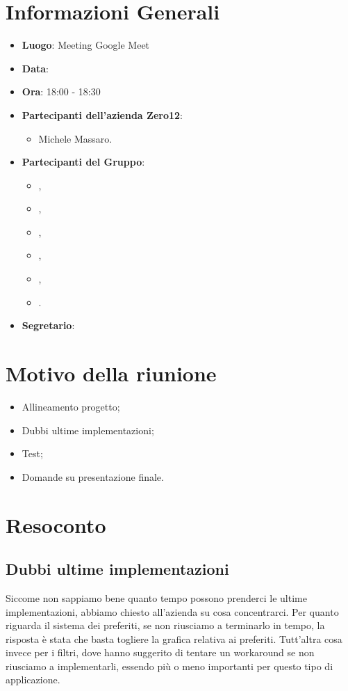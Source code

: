 \section{Informazioni Generali}

\begin{itemize}
\item{\textbf{Luogo}}: Meeting Google Meet
\item{\textbf{Data}}: \D
\item{\textbf{Ora}}: 18:00 - 18:30
\item{\textbf{Partecipanti dell'azienda Zero12}}: 
	\begin{itemize}
	\item{Michele Massaro.} 
	\end{itemize} 
\item{\textbf{Partecipanti del Gruppo}}: 
	\begin{itemize}
	\item{\EP{},} 
	\item{\FP{},}
	\item{\GC{},}
	\item{\LW{},}	
	\item{\MB{},}
	\item{\PV{}.}
	\end{itemize} 
\item{\textbf{Segretario}}: \PV{}
\end{itemize}

\section{Motivo della riunione}
\begin{itemize}
	\item {Allineamento progetto;}
	\item {Dubbi ultime implementazioni;}
 	\item {Test;}
  	\item {Domande su presentazione finale.}
\end{itemize}

\section{Resoconto}

\subsection{Dubbi ultime implementazioni}
Siccome non sappiamo bene quanto tempo possono prenderci le ultime implementazioni, abbiamo chiesto all'azienda su cosa concentrarci. Per quanto riguarda il sistema dei preferiti, se non riusciamo a terminarlo in tempo, la risposta è stata che basta togliere la grafica relativa ai preferiti. Tutt'altra cosa invece per i filtri, dove hanno suggerito di tentare un workaround se non riusciamo a implementarli, essendo più o meno importanti per questo tipo di applicazione.

